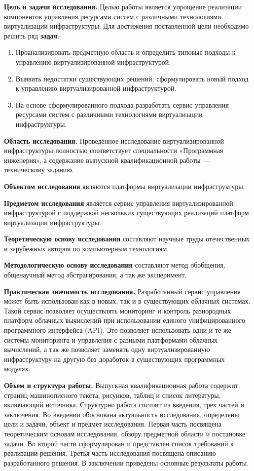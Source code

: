 \textbf{Цель и задачи исследования.}
Целью работы является упрощение реализации компонентов управления ресурсами систем с различными технологиями виртуализации инфраструктуры.
Для достижения поставленной цели необходимо решить ряд \textbf{задач}.
\begin{enumerate}
    \item Проанализировать предметную область и определить типовые подходы к управлению виртуализированной инфраструктурой.
    \item Выявить недостатки существующих решений; сформулировать новый подход к управлению виртуализированной инфраструктурой.
    \item На основе сформулированного подхода разработать сервис управления ресурсами систем с различными технологиями виртуализации инфраструктуры.
\end{enumerate}

\textbf{Область исследования.}
Проведённое исследование виртуализированной инфраструктуры полностью соответствует специальности «Программная инженерия», а содержание выпускной квалификационной работы --- техническому заданию.

\textbf{Объектом исследования} являются платформы виртуализации инфраструктуры.

\textbf{Предметом исследования} является сервис управления виртуализированной инфраструктурой с поддержкой нескольких существующих реализаций платформ виртуализации инфраструктуры.

\textbf{Теоретическую основу исследования} составляют научные труды отечественных и зарубежных авторов по компьютерным технологиям.

\textbf{Методологическую основу исследования} составляют метод обобщения, общенаучный метод абстрагирования, а так же эксперимент.

\textbf{Практическая значимость исследования.} Разработанный сервис управления может быть использован как в новых, так и в существующих облачных системах.
Такой сервис позволяет осуществлять мониторинг и контроль разнородных платформ облачных вычислений при использовании единого унифицированного программного интерфейса (API).
Это позволяет использовать одни и те же системы мониторинга и управления с разными платформами облачных вычислений, а так же позволяет заменять одну виртуализированную инфраструктуру на другую без доработок в существующих программных модулях.

\textbf{Объем и структура работы.}
Выпускная квалификационная работа содержит  страниц машинописного текста,  рисунков,  таблиц и список литературы, включающий  источника. 
Структурно работа состоит из введения, трех частей и заключения. 
Во введении обоснована актуальность исследования, определены цели и задачи, объект и предмет исследования. 
Первая часть посвящена теоретическим основам исследования, обзору предметной области и постановке задачи. 
Во второй части сформулирован и представлен список требований к реализации решения.
Третья часть исследования посвящена описанию разработанного решения.
В заключении приведены основные результаты работы.
